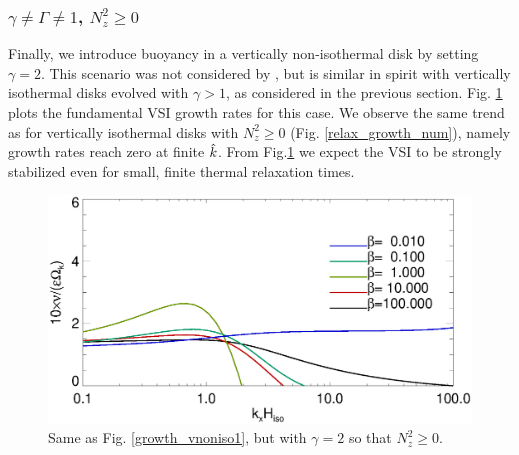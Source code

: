 \subsubsection{$\gamma\neq\Gamma \neq 1$, $N_z^2\geq0$}
Finally, we introduce buoyancy in a vertically non-isothermal disk by
setting $\gamma=2$. This scenario was not considered by  
\cite{nelson13}, but is similar in spirit with vertically isothermal 
disks evolved with $\gamma>1$, as considered in the previous section. 
Fig. \ref{growth_vnoniso2} plots the fundamental VSI growth rates for
this case. We observe the same trend as for vertically isothermal
disks with $N_z^2\geq 0$ (Fig. \ref{relax_growth_num}), namely growth
rates reach zero at finite $\hat{k}$. From Fig.\ref{growth_vnoniso2} we
expect the VSI to be strongly stabilized even for small, finite
thermal relaxation times.  

\begin{figure}
  \includegraphics[width=\linewidth,clip=true,trim=0cm 0cm 0cm
  0cm]{figures/growth_vnoniso2}
  \caption{Same as Fig. \ref{growth_vnoniso1}, but with $\gamma=2$ so that
    $N_z^2\geq0$. \label{growth_vnoniso2}}
\end{figure} 

 






















